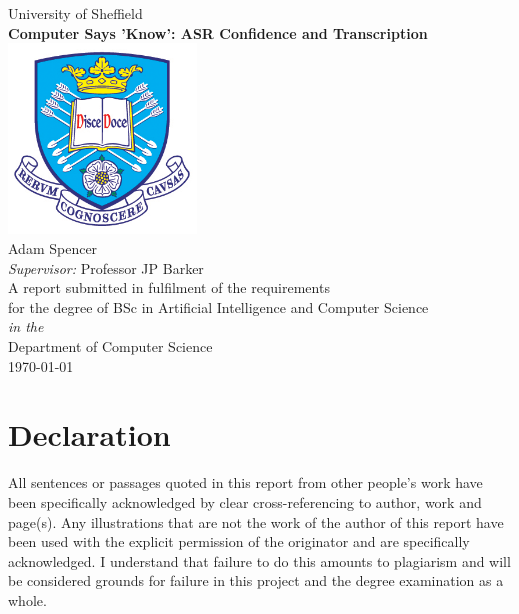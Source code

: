 \documentclass[11pt,oneside]{book}
\begin{document}
\frontmatter

\begin{titlepage}


\begin{center}
{\LARGE University of Sheffield}\\[1.5cm]
\linespread{1.2}\huge {\bfseries Computer Says 'Know': ASR Confidence and Transcription}\\[1.5cm]
\linespread{1}
\includegraphics[width=5cm]{images/tuoslogo}\\[1cm]
{\Large Adam Spencer}\\[1cm]
{\large \emph{Supervisor:} Professor JP Barker}\\[1cm]
\large A report submitted in fulfilment of the requirements\\ for the degree of BSc in Artificial Intelligence and Computer Science\\[0.3cm] 
\textit{in the}\\[0.3cm]
Department of Computer Science\\[2cm]
\today
\end{center}

\end{titlepage}


\newpage
\chapter*{\Large Declaration}


All sentences or passages quoted in this report from other people's work have been specifically acknowledged by clear cross-referencing to author, work and page(s). Any illustrations that are not the work of the author of this report have been used with the explicit permission of the originator and are specifically acknowledged. I understand that failure to do this amounts to plagiarism and will be considered grounds for failure in this project and the degree examination as a whole.\\[1cm]
\end{document}
